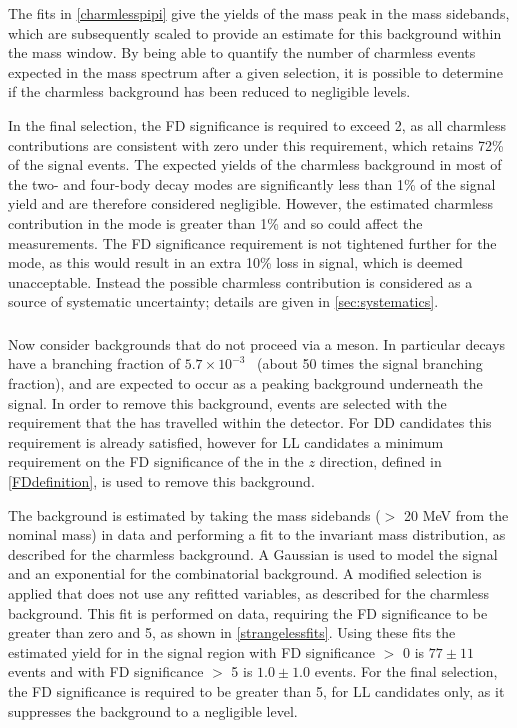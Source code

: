 The fits in \fig\ref{charmlesspipi} give the yields of the \Bm mass peak in the \Dz mass sidebands, which are subsequently scaled to provide an estimate for this background within the \Dz mass window. By being able to quantify the number of charmless events expected in the \Bm mass spectrum after a given selection, it is possible to determine if the charmless background has been reduced to negligible levels. 

In the final selection, the \Dz FD significance is required to exceed 2, as all charmless contributions are consistent with zero under this requirement, which retains 72\% of the signal events. The expected yields of the charmless background in most of the two- and four-body \Dz decay modes are significantly less than 1\% of the signal yield and are therefore considered negligible. However, the estimated charmless contribution in the \pipi mode is greater than 1\% and so could affect the measurements. The \Dz FD significance requirement is not tightened further for the \pipi mode, as this would result in an extra 10\% loss in signal, which is deemed unacceptable. Instead the possible charmless contribution is considered as a source of systematic uncertainty; details are given in \sect\ref{sec:systematics}. 

\subsubsection{\boldmath \decay{\Bm}{\D\pim\pip\pim}}
\label{sec:backgrounds:b2dpipipi}

Now consider backgrounds that do not proceed via a \KS meson. In particular \decay{\Bm}{\D\pim\pip\pim} decays have a branching fraction of $5.7 \times 10^{-3}$~\cite{PDG2014} (about 50 times the signal \decay{\Bm}{\D\Kstarm(\KS(\pip\pim)\pim)} branching fraction), and are expected to occur as a peaking background underneath the signal. In order to remove this background, events are selected with the requirement that the \KS has travelled within the detector. For DD candidates this requirement is already satisfied, however for LL candidates a minimum requirement on the FD significance of the \KS in the $z$ direction, defined in \eqn\ref{FDdefinition}, is used to remove this background. 

The \decay{\Bm}{\D\pim\pip\pim} background is estimated by taking the \KS mass sidebands ($>$ 20 MeV from the nominal \KS mass) in data and performing a fit to the invariant \Bm mass distribution, as described for the charmless background. A Gaussian is used to model the signal and an exponential for the combinatorial background. A modified selection is applied that does not use any refitted variables, as described for the charmless background. This fit is performed on \kpi data, requiring the \KS FD significance to be greater than zero and 5, as shown in \fig\ref{strangelessfits}. Using these fits the estimated \decay{\Bm}{\D\pim\pip\pim} yield for \runtwo in the signal region with \KS FD significance $>$ 0 is $77 \pm 11$ events and with \KS FD significance $>$ 5 is $1.0 \pm 1.0$ events. For the final selection, the \KS FD significance is required to be greater than 5, for LL candidates only, as it suppresses the \decay{\Bm}{\D\pim\pip\pim} background to a negligible level.

